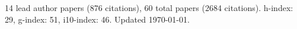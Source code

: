 14 lead author papers (876 citations),
60 total papers (2684 citations).\newline
h-index: 29, g-index: 51, i10-index: 46. Updated \today.